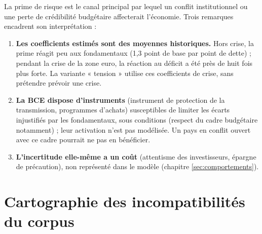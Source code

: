 \documentclass[
  11pt,
  11pt,
  a4paper,
  openany]{book}
\providecommand{\tightlist}{%
  \setlength{\itemsep}{0pt}\setlength{\parskip}{0pt}}
\begin{document}
La prime de risque est le canal principal par lequel un conflit
institutionnel ou une perte de crédibilité budgétaire affecterait
l'économie. Trois remarques encadrent son interprétation :

\begin{enumerate}
\def\labelenumi{\arabic{enumi}.}
\tightlist
\item
  \textbf{Les coefficients estimés sont des moyennes historiques.} Hors
  crise, la prime réagit peu aux fondamentaux (1,3 point de base par
  point de dette) ; pendant la crise de la zone euro, la réaction au
  déficit a été près de huit fois plus forte. La variante « tension »
  utilise ces coefficients de crise, sans prétendre prévoir une crise.
\item
  \textbf{La BCE dispose d'instruments} (instrument de protection de la
  transmission, programmes d'achats) susceptibles de limiter les écarts
  injustifiés par les fondamentaux, sous conditions (respect du cadre
  budgétaire notamment) ; leur activation n'est pas modélisée. Un pays
  en conflit ouvert avec ce cadre pourrait ne pas en bénéficier.
\item
  \textbf{L'incertitude elle-même a un coût} (attentisme des
  investisseurs, épargne de précaution), non représenté dans le modèle
  (chapitre \ref{sec:comportements}).
\end{enumerate}

\hypertarget{sec:cartographie-ue}{%
\section{Cartographie des incompatibilités du
corpus}\label{sec:cartographie-ue}}
\end{document}
